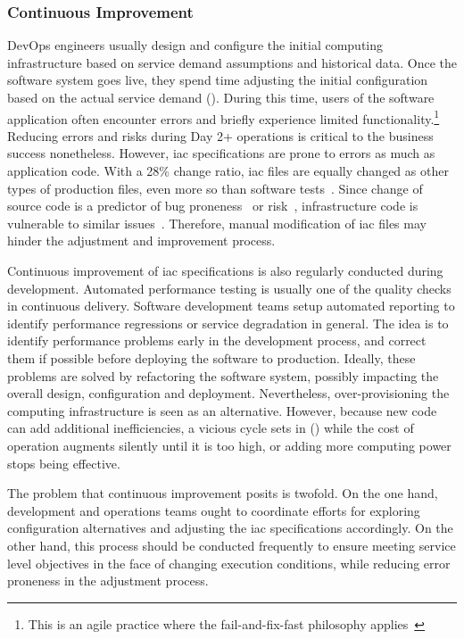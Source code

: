 \subsubsection{Continuous Improvement}
\label{subsubsect:overview--iac-case-study-continuous-improvement}

DevOps engineers usually design and configure the initial computing infrastructure based on service demand assumptions and historical data. Once the software system goes live, they spend time adjusting the initial configuration based on the actual service demand (). During this time, users of the software application often encounter errors and briefly experience limited functionality.\footnote{This is an agile practice where the fail-and-fix-fast philosophy applies~\cite{shore-2004-fail}} Reducing errors and risks during Day 2+ operations is critical to the business success nonetheless. However, \gls{iac} specifications are prone to errors as much as application code. With a 28\% change ratio, \gls{iac} files are equally changed as other types of production files, even more so than software tests~\cite{jiang-2015-co-evolution}. Since change of source code is a predictor of bug proneness~\cite{aversano-2007-learning,sunghun-2006-automatic} or risk~\cite{shihab-2012-industrial}, infrastructure code is vulnerable to similar issues~\cite{jiang-2015-co-evolution}. Therefore, manual modification of \gls{iac} files may hinder the adjustment and improvement process.

Continuous improvement of \gls{iac} specifications is also regularly conducted during development. Automated performance testing is usually one of the quality checks in continuous delivery. Software development teams setup automated reporting to identify performance regressions or service degradation in general. The idea is to identify performance problems early in the development process, and correct them if possible before deploying the software to production. Ideally, these problems are solved by refactoring the software system, possibly impacting the overall design, configuration and deployment. Nevertheless, over-provisioning the computing infrastructure is seen as an alternative. However, because new code can add additional inefficiencies, a vicious cycle sets in () while the cost of operation augments silently until it is too high, or adding more computing power stops being effective.

The problem that continuous improvement posits is twofold. On the one hand, development and operations teams ought to coordinate efforts for exploring configuration alternatives and adjusting the \gls{iac} specifications accordingly. On the other hand, this process should be conducted frequently to ensure meeting service level objectives in the face of changing execution conditions, while reducing error proneness in the adjustment process.

